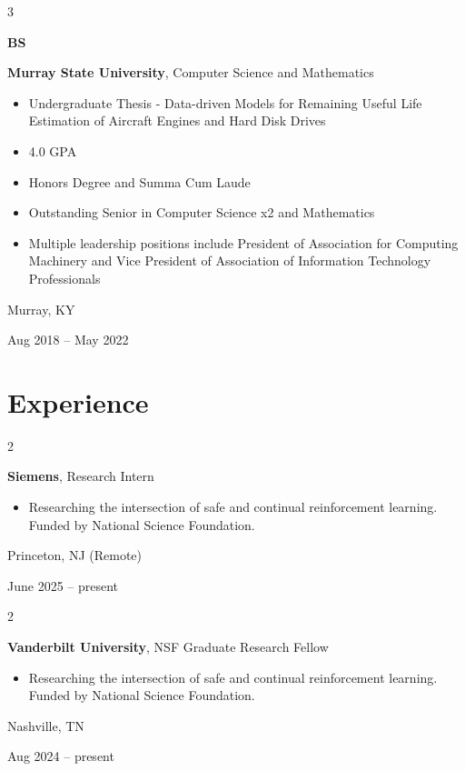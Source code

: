 \documentclass[10pt, letterpaper]{article}
\newenvironment{highlights}{
    \begin{itemize}[
        topsep=0.10 cm,
        parsep=0.10 cm,
        partopsep=0pt,
        itemsep=0pt,
        leftmargin=0.4 cm + 10pt
    ]
}{
    \end{itemize}
} %
\newenvironment{twocolentry}[2][]{
    \onecolentry
    \def\secondColumn{#2}
    \setcolumnwidth{\fill, 4.5 cm}
    \begin{paracol}{2}
}{
    \switchcolumn \raggedleft \secondColumn
    \end{paracol}
    \endonecolentry
} %
\newenvironment{threecolentry}[3][]{
    \onecolentry
    \def\thirdColumn{#3}
    \setcolumnwidth{1 cm, \fill, 4.5 cm}
    \begin{paracol}{3}
    {\raggedright #2} \switchcolumn
}{
    \switchcolumn \raggedleft \thirdColumn
    \end{paracol}
    \endonecolentry
} %
\begin{document}
        \vspace{0.2 cm}

        \begin{threecolentry}{\textbf{BS}}{
            Murray, KY

        Aug 2018 – May 2022
        }
            \textbf{Murray State University}, Computer Science and Mathematics
            \begin{highlights}
                \item Undergraduate Thesis - Data-driven Models for Remaining Useful Life Estimation of Aircraft Engines and Hard Disk Drives
                \item 4.0 GPA
                \item Honors Degree and Summa Cum Laude
                \item Outstanding Senior in Computer Science x2 and Mathematics
                \item Multiple leadership positions include President of Association for Computing Machinery and Vice President of Association of Information Technology Professionals
            \end{highlights}
        \end{threecolentry}


    
    \section{Experience}



        
        \begin{twocolentry}{
            Princeton, NJ (Remote)

        June 2025 – present
        }
            \textbf{Siemens}, Research Intern
            \begin{highlights}
                \item Researching the intersection of safe and continual reinforcement learning. Funded by National Science Foundation.
            \end{highlights}
        \end{twocolentry}


        \vspace{0.2 cm}

        \begin{twocolentry}{
            Nashville, TN

        Aug 2024 – present
        }
            \textbf{Vanderbilt University}, NSF Graduate Research Fellow
            \begin{highlights}
                \item Researching the intersection of safe and continual reinforcement learning. Funded by National Science Foundation.
            \end{highlights}
        \end{twocolentry}
\end{document}
